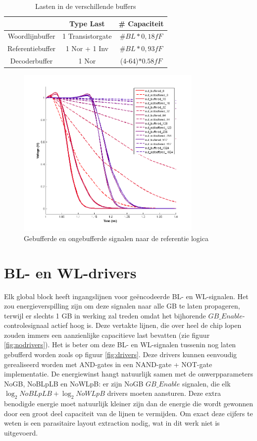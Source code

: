 \begin{table}
\begin{center}
\begin{tabular}{ccc}
\hline
 & Type Last & \# Capaciteit\\
\hline
Woordlijnbuffer & 1 Transistorgate &  $\#BL*0,18fF$\\
Referentiebuffer & 1 Nor + 1 Inv &  $\#BL*0,93fF$\\
Decoderbuffer & 1 Nor & (4-64)$*0.58fF$\\
\hline
\end{tabular}
\end{center}
\caption{Lasten in de verschillende buffers}
\label{tab:buffer}
\end{table}

\begin{figure}[!ht]
  \centering
  \includegraphics[width=0.8\textwidth]{../fig/hfdst-buffers-refbuffer.png}
  \caption{Gebufferde en ongebufferde signalen naar de referentie logica}
  \label{fig:refbuffer}
\end{figure}

\section{BL- en WL-drivers}
Elk global block heeft ingangslijnen voor geëncodeerde BL- en WL-signalen. Het zou energieverspilling zijn om deze signalen naar alle GB te laten propageren, terwijl er slechts 1 GB in werking zal treden omdat het bijhorende $GB\_{Enable}$-controlesignaal actief hoog is. Deze vertakte lijnen, die over heel de chip lopen zouden immers een aanzienlijke capacitieve last bevatten (zie figuur \ref{fig:nodrivers}). Het is beter om deze BL- en WL-signalen tussenin nog laten gebufferd worden zoals op figuur \ref{fig:drivers}. Deze drivers kunnen eenvoudig gerealiseerd worden met AND-gates in een NAND-gate + NOT-gate implementatie.
De energiewinst hangt natuurlijk samen met de onwerpparameters NoGB, NoBLpLB en NoWLpB: er zijn NoGB $GB\_{Enable}$ signalen, die elk $\log_2 NoBLpLB +\log_2 NoWLpB$ drivers moeten aansturen. Deze extra benodigde energie moet natuurlijk kleiner zijn dan de energie die wordt gewonnen door een groot deel capaciteit van de lijnen te vermijden. Om exact deze cijfers te weten is een parasitaire layout extraction nodig, wat in dit werk niet is uitgevoerd.

